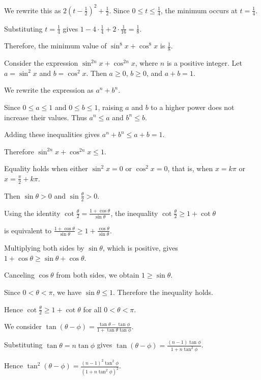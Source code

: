   We rewrite this as
  $2\left(t - \frac12\right)^2 + \frac12$.
  Since $0 \le t \le \frac14$, the minimum occurs at $t = \frac14$.

  Substituting $t = \frac14$ gives
  $1 - 4 \cdot \frac14 + 2 \cdot \frac{1}{16} = \frac18$.

  Therefore, the minimum value of $\sin^8 x + \cos^8 x$ is $\frac18$.
\item Consider the expression $\sin^{2n} x + \cos^{2n} x$, where $n$ is a positive integer.
  Let $a = \sin^2 x$ and $b = \cos^2 x$.
  Then $a \ge 0$, $b \ge 0$, and $a + b = 1$.

  We rewrite the expression as
  $a^n + b^n$.

  Since $0 \le a \le 1$ and $0 \le b \le 1$, raising $a$ and $b$ to a higher power does not increase their values.
  Thus
  $a^n \le a$ and $b^n \le b$.

  Adding these inequalities gives
  $a^n + b^n \le a + b = 1$.

  Therefore
  $\sin^{2n} x + \cos^{2n} x \le 1$.

  Equality holds when either $\sin^2 x = 0$ or $\cos^2 x = 0$, that is, when $x = k\pi$ or $x = \frac{\pi}{2} + k\pi$.
\item Then $\sin \theta > 0$ and $\sin \frac{\theta}{2} > 0$.

  Using the identity
  $\cot \frac{\theta}{2} = \frac{1 + \cos \theta}{\sin \theta}$,
  the inequality
  $\cot \frac{\theta}{2} \ge 1 + \cot \theta$

  is equivalent to
  $\frac{1 + \cos \theta}{\sin \theta} \ge 1 + \frac{\cos \theta}{\sin \theta}$.

  Multiplying both sides by $\sin \theta$, which is positive, gives
  $1 + \cos \theta \ge \sin \theta + \cos \theta$.

  Canceling $\cos \theta$ from both sides, we obtain
  $1 \ge \sin \theta$.

  Since $0 < \theta < \pi$, we have $\sin \theta \le 1$.
  Therefore the inequality holds.

  Hence
  $\cot \frac{\theta}{2} \ge 1 + \cot \theta$
  for all $0 < \theta < \pi$.
\item We consider
  $\tan(\theta - \phi) = \frac{\tan \theta - \tan \phi}{1 + \tan \theta \tan \phi}$.

  Substituting $\tan \theta = n \tan \phi$ gives
  $\tan(\theta - \phi) = \frac{(n - 1)\tan \phi}{1 + n \tan^2 \phi}$.

  Hence
  $\tan^2(\theta - \phi) = \frac{(n - 1)^2 \tan^2 \phi}{(1 + n \tan^2 \phi)^2}$.

